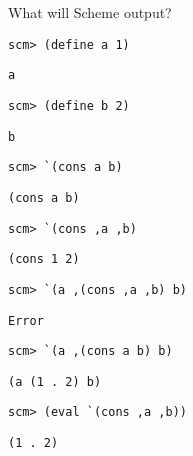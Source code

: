 \begin{blocksection}
\question What will Scheme output?


\begin{lstlisting}
scm> (define a 1)
\end{lstlisting}
\begin{solution}[0.25in] 
\texttt{a}
\end{solution}

\begin{lstlisting}
scm> (define b 2)
\end{lstlisting}
\begin{solution}[0.25in]
\texttt{b}
\end{solution}

\begin{lstlisting}
scm> `(cons a b)
\end{lstlisting}
\begin{solution}[0.25in]
\texttt{(cons a b)}
\end{solution}

\begin{lstlisting}
scm> `(cons ,a ,b)
\end{lstlisting}
\begin{solution}[.25in]
\texttt{(cons 1 2)}
\end{solution}

\begin{lstlisting}
scm> `(a ,(cons ,a ,b) b)
\end{lstlisting}
\begin{solution}[.25in]
\texttt{Error}
\end{solution}

\begin{lstlisting}
scm> `(a ,(cons a b) b)
\end{lstlisting}
\begin{solution}[.25in]
\texttt{(a (1 . 2) b)}
\end{solution}

\begin{lstlisting}
scm> (eval `(cons ,a ,b))
\end{lstlisting}
\begin{solution}[.25in]
\texttt{(1 . 2)}
\end{solution}
\end{blocksection}

